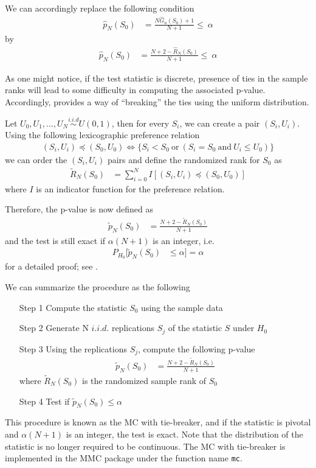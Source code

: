 \documentclass[]{article}\usepackage[]{graphicx}\usepackage[]{color}
\newcommand{\pkg}[1]{{\normalfont\fontseries{b}\selectfont #1}}
\let\code=\texttt
\begin{document}
We can accordingly replace the following condition
\begin{align}
\hat{p}_{N}(S_{0}) & = \frac{N\hat{G}_{n}(S_{0})+1}{N+1} \leq\ \alpha
\end{align}
by
\begin{align}
\hat{p}_{N}(S_{0}) & = \frac{N + 2 -\hat{R}_N(S_0)}{N+1} \leq\ \alpha
\end{align}

As one might notice, if the test statistic is discrete, presence of ties in the sample ranks will lead to some difficulty in computing the associated p-value. Accordingly, \cite{dufour_monte_2006} provides a way of ``breaking'' the ties using the uniform distribution.

Let $U_0, U_1,...,U_N \overset{i.i.d}{\sim} U(0,1)$, then for every $S_i$, we can create a pair $(S_i,U_i)$. Using the following lexicographic preference relation
\begin{align}
(S_i,U_i) \preccurlyeq (S_0,U_0) \Longleftrightarrow \{ S_i<S_0 \ \mathrm{or} \ ( S_i = S_0 \ \mathrm{and} \ U_i \leq U_0 ) \}
\end{align}
we can order the $(S_i,U_i)$ pairs and define the randomized rank for $S_0$ as
\begin{align}
\tilde{R}_{N}(S_0) & = \sum_{i=0}^{N}I[(S_i,U_i) \preccurlyeq (S_0,U_0)]
\end{align}
where $I$ is an indicator function for the preference relation.

Therefore, the p-value is now defined as
\begin{align}
\tilde{p}_{N}(S_{0}) & = \frac{N + 2 -\tilde{R}_N(S_0)}{N+1}
\end{align}
and the test is still exact if $\alpha(N+1)$ is an integer, i.e.
\begin{align}
P_{H_{0}}[\tilde{p}_{N}(S_{0}) & \leq\alpha]=\alpha
\end{align}
for a detailed proof; see \citet{dufour_monte_2006}.

We can summarize the procedure as the following
\begin{itemize}
\item[Step 1] Compute the statistic $S_0$ using the sample data
\item[Step 2] Generate N $i.i.d.$ replications $S_{j}$ of the statistic $S$ under $H_0$
\item[Step 3] Using the replications $S_{j}$, compute the following p-value
\begin{align}
\tilde{p}_{N}(S_{0}) & = \frac{N + 2 -\tilde{R}_N(S_0)}{N+1}
\end{align}
where $\tilde{R}_N(S_0)$ is the randomized sample rank of $S_0$
\item[Step 4]  Test if $\tilde{p}_{N}(S_{0})\leq \alpha$
\end{itemize}
This procedure is known as the MC with tie-breaker, and if the statistic is pivotal and $\alpha(N+1)$ is an integer, the test is exact. Note that the distribution of the statistic is no longer required to be continuous. The MC with tie-breaker is implemented in the \pkg{MMC} package under the function name \code{mc}.
\end{document}
